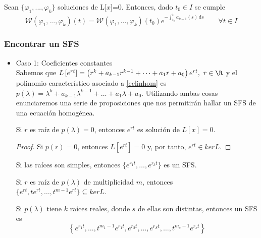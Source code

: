 \begin{nprop}
  Sean $\{\varphi_1,...,\varphi_k\}$ soluciones de L[$x$]=0. Entonces, dado $t_0 \in I$ se cumple
  \[
  \mathcal{W}(\varphi_1,...,\varphi_k)(t) = \mathcal{W}(\varphi_1,...,\varphi_k)(t_0) e^{- \int_{t_0}^t \! a_{k-1}(s) \, \mathrm{d}s } \qquad \forall t \in I
  \]
\end{nprop}


\subsubsection{Encontrar un SFS}
\begin{itemize}
\item Caso 1: Coeficientes constantes\\
  Sabemos que $L\left[e^{rt}\right] = \left(r^k + a_{k-1}r^{k-1}+\dots+a_1r+a_0\right)e^{rt},\ r \in \R$ y el polinomio característico asociado a \ref{eclinhom} es $p(\lambda) = \lambda^k +a_{k-1}\lambda^{k-1}+\dots+a_1\lambda+a_0$. Utilizando ambas cosas enunciaremos una serie de proposiciones que nos permitirán hallar un SFS de una ecuación homogénea.

  \begin{nprop}
    Si $r$ es raíz de $p(\lambda)=0$, entonces $e^{rt}$ es solución de $L[x] = 0$.
  \end{nprop}

  \begin{proof}
    Si $p(r)=0$, entonces $L\left[e^{rt}\right] = 0$ y, por tanto, $e^{rt} \in kerL$.
  \end{proof}

  \begin{nota}
    Si las raíces son simples, entonces $\{e^{r_1t},\dots,e^{r_kt}\}$ es un SFS.
  \end{nota}
  
  \begin{nprop}
    Si $r$ es raíz de $p(\lambda)$ de multiplicidad $m$, entonces $\{e^{rt}, te^{rt},\dots,t^{m-1}e^{rt}\} \subseteq kerL$.
  \end{nprop}

  \begin{ncor}
    Si $p(\lambda)$ tiene $k$ raíces reales, donde $s$ de ellas son distintas, entonces un SFS es
    \[
    \left\{e^{r_1t},\dots,t^{m_1-1}e^{r_1t},e^{r_2t},\dots,e^{r_St},\dots,t^{m_s-1}e^{r_st}\right\}
    \]
  \end{ncor}


\end{itemize}
